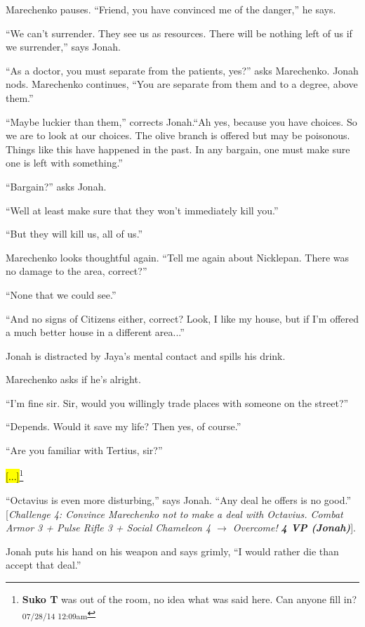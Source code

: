 Marechenko pauses.  ``Friend, you have convinced me of the danger,'' he says.

``We can't surrender.  They see us as resources.  There will be nothing left of us if we surrender,'' says Jonah.

``As a doctor, you must separate from the patients, yes?'' asks Marechenko.  Jonah nods.  Marechenko continues, ``You are separate from them and to a degree, above them.''

``Maybe luckier than them,'' corrects Jonah.``Ah yes, because you have choices.  So we are to look at our choices.  The olive branch is offered but may be poisonous.  Things like this have happened in the past.  In any bargain, one must make sure one is left with something.''

``Bargain?'' asks Jonah.

``Well at least make sure that they won't immediately kill you.''

``But they will kill us, all of us.''

Marechenko looks thoughtful again.  ``Tell me again about Nicklepan. There was no damage to the area, correct?''

``None that we could see.''

``And no signs of Citizens either, correct?   Look, I like my house, but if I'm offered a much better house in a different area...''

 Jonah is distracted by Jaya's mental contact and spills his drink.

Marechenko asks if he's alright.

``I'm fine sir.  Sir, would you willingly trade places with someone on the street?''

``Depends.  Would it save my life?  Then yes, of course.''

``Are you familiar with Tertius, sir?''

\hl{{[}...{]}}\footnote{\textbf{Suko T }was out of the room, no idea what was said here.  Can anyone fill in? \textsubscript{07/28/14 12:09am}}

``Octavius is even more disturbing,'' says Jonah.  ``Any deal he offers is no good.'' {[}\textit{Challenge 4: Convince Marechenko not to make a deal with Octavius.  Combat Armor 3 + Pulse Rifle 3 + Social Chameleon 4 $\rightarrow$ Overcome! }\textit{\textbf{4 VP (Jonah)}}{]}.  

Jonah puts his hand on his weapon and says grimly, ``I would rather die than accept that deal.''

